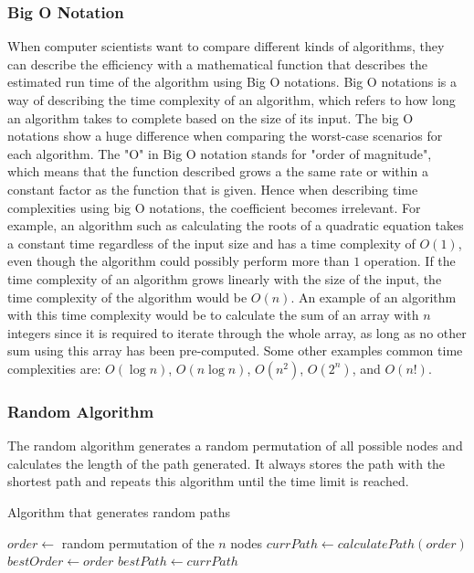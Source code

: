 \documentclass{article}
\begin{document}
\subsubsection{Big O Notation}\label{Big O}
When computer scientists want to compare different kinds of algorithms, they can describe the efficiency with a mathematical function that describes the estimated run time of the algorithm using Big O notations. Big O notations is a way of describing the time complexity of an algorithm, which refers to how long an algorithm takes to complete based on the size of its input. The big O notations show a huge difference when comparing the worst-case scenarios for each algorithm.
\newline
 The "O" in Big O notation stands for "order of magnitude", which means that the function described grows a the same rate or within a constant factor as the function that is given. Hence when describing time complexities using big O notations, the coefficient becomes irrelevant. For example, an algorithm such as calculating the roots of a quadratic equation takes a constant time regardless of the input size and has a time complexity of $O(1)$, even though the algorithm could possibly perform more than $1$ operation. If the time complexity of an algorithm grows linearly with the size of the input, the time complexity of the algorithm would be $O(n)$. An example of an algorithm with this time complexity would be to calculate the sum of an array with $n$ integers since it is required to iterate through the whole array, as long as no other sum using this array has been pre-computed. Some other examples common time complexities are: $O(\log{n})$, $O(n \log{n})$, $O(n^2)$, $O(2^n)$, and $O(n!)$.


\newline

\subsubsection{Random Algorithm}\label{Dijkstras}
The random algorithm generates a random permutation of all possible nodes and calculates the length of the path generated. It always stores the path with the shortest path and repeats this algorithm until the time limit is reached. 

\begin{algorithm}
\caption{Algorithm that generates random paths}\label{Random Algorithm}
\begin{algorithmic}

\State $order \gets $ random permutation of the $n$ nodes
\State $currPath \gets calculatePath(order)$
\State $bestOrder \gets order$
\State $bestPath \gets currPath$
\EndIf
\EndWhile

\end{algorithmic}
\end{algorithm}
\end{document}
